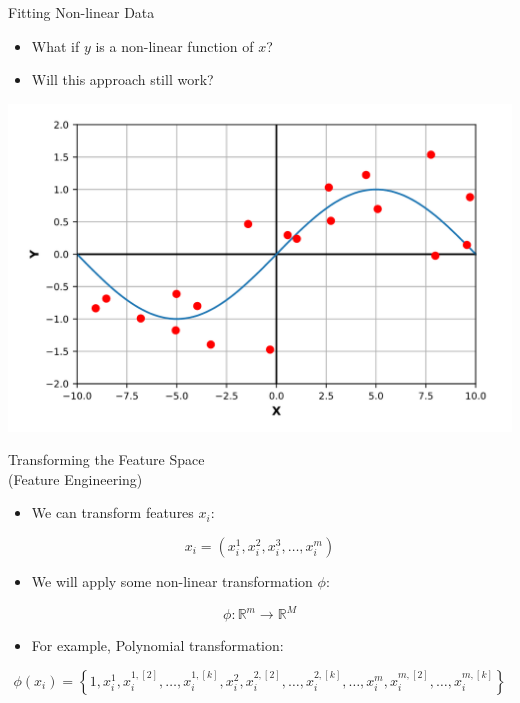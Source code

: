 \begin{frame}{Fitting Non-linear Data}
\begin{itemize}
    \item What if $y$ is a non-linear function of $x$? 
    \item Will this approach still work?
\end{itemize}

\begin{center}
    \includegraphics[width=0.75\linewidth]{images/linear-regression/linear-regression-11.png}
\end{center}
\end{frame}


\begin{frame}{Transforming the Feature Space \\ (Feature Engineering)}
\begin{itemize}
    \item We can transform features $x_i$:
\end{itemize}

\[
x_i = \left(x_i^{1}, x_i^{2}, x_i^{3}, \dots, x_i^{m}\right)
\]

\vspace{0.5em}

\begin{itemize}
    \item We will apply some non-linear transformation $\phi$:
\end{itemize}

\[
\phi : \mathbb{R}^m \rightarrow \mathbb{R}^M
\]

\vspace{0.5em}

\begin{itemize}
    \item For example, Polynomial transformation:
\end{itemize}

\[
\phi(x_i) = \left\{ 1, x_i^{1}, x_i^{1,[2]}, \dots, x_i^{1,[k]}, x_i^{2}, x_i^{2,[2]}, \dots, x_i^{2,[k]}, \dots, x_i^{m}, x_i^{m,[2]}, \dots, x_i^{m,[k]} \right\}
\]
\end{frame}



